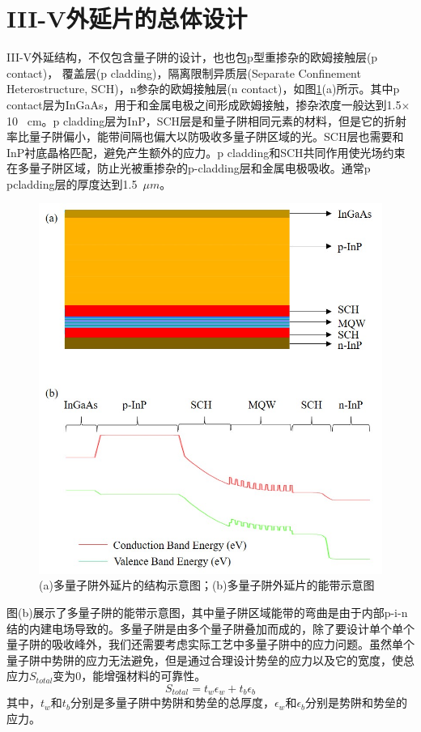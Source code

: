 \section{III-V外延片的总体设计}
III-V外延结构，不仅包含量子阱的设计，也也包p型重掺杂的欧姆接触层(p contact)， 覆盖层(p cladding)，隔离限制异质层(Separate Confinement Heterostructure, SCH)，n参杂的欧姆接触层(n contact)，如图\ref{fig_ch2_banddiagram}(a)所示。其中p contact层为InGaAs，用于和金属电极之间形成欧姆接触，掺杂浓度一般达到1.5$\times$10 ~cm。p cladding层为InP，SCH层是和量子阱相同元素的材料，但是它的折射率比量子阱偏小，能带间隔也偏大以防吸收多量子阱区域的光。SCH层也需要和InP衬底晶格匹配，避免产生额外的应力。p cladding和SCH共同作用使光场约束在多量子阱区域，防止光被重掺杂的p-cladding层和金属电极吸收。通常p pcladding层的厚度达到1.5~$\mu m$。
\begin{figure}[htb]
	\centering
	\includegraphics[width=12cm]{./Pictures/fig_ch2_banddiagram.jpg}
	\caption{(a)多量子阱外延片的结构示意图；(b)多量子阱外延片的能带示意图}
	\label{fig_ch2_banddiagram}
\end{figure}

图\cite{fig_ch2_banddiagram}(b)展示了多量子阱的能带示意图，其中量子阱区域能带的弯曲是由于内部p-i-n结的内建电场导致的。多量子阱是由多个量子阱叠加而成的，除了要设计单个单个量子阱的吸收峰外，我们还需要考虑实际工艺中多量子阱中的应力问题。虽然单个量子阱中势阱的应力无法避免，但是通过合理设计势垒的应力以及它的宽度，使总应力$S_{total}$变为0，能增强材料的可靠性\cite{chen2011high}。
\begin{equation}
\label{Equ:strain_net}
S_{total} = t_{w}\epsilon_{w}+t_b\epsilon_b
\end{equation}
其中，$t_{w}$和$t_{b}$分别是多量子阱中势阱和势垒的总厚度，$\epsilon_w$和$\epsilon_b$分别是势阱和势垒的应力。

